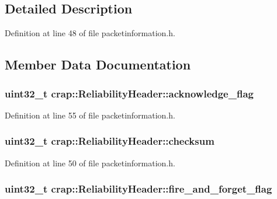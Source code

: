 \subsection{Detailed Description}


Definition at line 48 of file packetinformation.\+h.



\subsection{Member Data Documentation}
\hypertarget{structcrap_1_1_reliability_header_a89ee7e532195d21fa94b9320ffc12578}{}
\subsubsection[{acknowledge\+\_\+flag}]{\setlength{\rightskip}{0pt plus 5cm}uint32\+\_\+t crap\+::\+Reliability\+Header\+::acknowledge\+\_\+flag}\label{structcrap_1_1_reliability_header_a89ee7e532195d21fa94b9320ffc12578}


Definition at line 55 of file packetinformation.\+h.

\hypertarget{structcrap_1_1_reliability_header_ad29af3f17ea49d36bcc2c49fdefd4007}{}
\subsubsection[{checksum}]{\setlength{\rightskip}{0pt plus 5cm}uint32\+\_\+t crap\+::\+Reliability\+Header\+::checksum}\label{structcrap_1_1_reliability_header_ad29af3f17ea49d36bcc2c49fdefd4007}


Definition at line 50 of file packetinformation.\+h.

\hypertarget{structcrap_1_1_reliability_header_aae57f5428ae59944ed200dc46795bc27}{}
\subsubsection[{fire\+\_\+and\+\_\+forget\+\_\+flag}]{\setlength{\rightskip}{0pt plus 5cm}uint32\+\_\+t crap\+::\+Reliability\+Header\+::fire\+\_\+and\+\_\+forget\+\_\+flag}\label{structcrap_1_1_reliability_header_aae57f5428ae59944ed200dc46795bc27}


